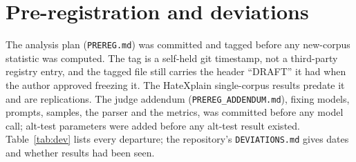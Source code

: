 \section{Pre-registration and deviations}
\label{app:deviations}
The analysis plan (\texttt{PREREG.md}) was committed and tagged before any new-corpus statistic was computed. The tag is a self-held git timestamp, not a third-party registry entry, and the tagged file still carries the header ``DRAFT'' it had when the author approved freezing it. The HateXplain single-corpus results predate it and are replications. The judge addendum (\texttt{PREREG\_ADDENDUM.md}), fixing models, prompts, samples, the parser and the metrics, was committed before any model call; alt-test parameters were added before any alt-test result existed. Table~\ref{tab:dev} lists every departure; the repository's \texttt{DEVIATIONS.md} gives dates and whether results had been seen.


